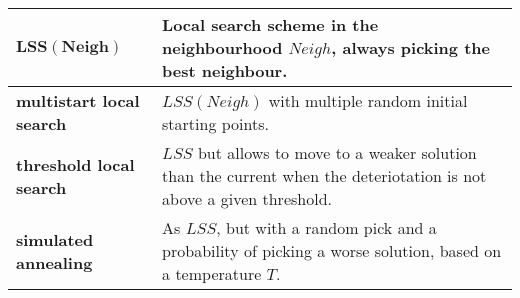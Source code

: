 \setlength{\tabcolsep}{6pt}
\begin{tabu} to \linewidth {X[-2.5, c, m] | X[l,m]}
  $\mathbf{LSS(Neigh)}$ & Local search scheme in the neighbourhood $Neigh$,
  always picking the best neighbour. \\ \hline
  \bf multistart \newline local search & $LSS(Neigh)$ with multiple random
  initial starting points. \\ \hline
  \bf threshold \newline local search & $LSS$ but allows to move to a weaker
  solution than the current when the deteriotation is not above a given
  threshold. \\ \hline
  \bf simulated \newline annealing & As $LSS$, but with a random pick and a
  probability of picking a worse solution, based on a temperature $T$. \\ \hline
\end{tabu}
